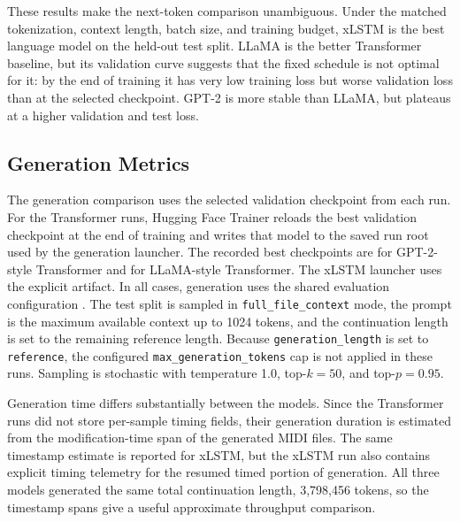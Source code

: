 These results make the next-token comparison unambiguous. Under the matched
tokenization, context length, batch size, and training budget, xLSTM is the best
language model on the held-out test split. LLaMA is the better Transformer
baseline, but its validation curve suggests that the fixed schedule is not
optimal for it: by the end of training it has very low training loss but worse
validation loss than at the selected checkpoint. GPT-2 is more stable than
LLaMA, but plateaus at a higher validation and test loss.

\subsection{Generation Metrics}

The generation comparison uses the selected validation checkpoint from each run.
For the Transformer runs, Hugging Face Trainer reloads the best validation
checkpoint at the end of training and  writes that
model to the saved run root used by the generation launcher. The recorded best
checkpoints are  for GPT-2-style Transformer and
 for LLaMA-style Transformer. The xLSTM launcher uses the
explicit  artifact. In all cases, generation uses the
shared evaluation configuration
. The test split is
sampled in \verb|full_file_context| mode, the prompt is the maximum available
context up to 1024 tokens, and the continuation length is set to the remaining
reference length. Because \verb|generation_length| is set to \verb|reference|,
the configured \verb|max_generation_tokens| cap is not applied in these runs.
Sampling is stochastic with temperature 1.0, top-\(k=50\), and top-\(p=0.95\).

Generation time differs substantially between the models. Since the Transformer
runs did not store per-sample timing fields, their generation duration is
estimated from the modification-time span of the generated MIDI files. The same
timestamp estimate is reported for xLSTM, but the xLSTM run also contains
explicit timing telemetry for the resumed timed portion of generation. All three
models generated the same total continuation length, 3,798,456 tokens, so the
timestamp spans give a useful approximate throughput comparison.

